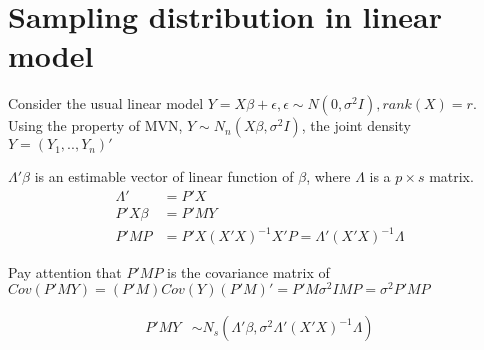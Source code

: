 
 \section{Sampling distribution in linear model}
 
 Consider the usual linear model $Y = X\beta + \epsilon, \epsilon \sim N(0, \sigma^2 I), rank(X) = r$. 
 Using the property of MVN, $Y \sim N_n (X \beta, \sigma^2 I) $, the joint density $Y = (Y_1, .., Y_n)'$
 
$\Lambda' \beta$ is an estimable vector of linear function of $\beta$, where $\Lambda$ is a $p \times s$ matrix. 
 \begin{align*}
\Lambda' &= P' X \\
P' X \beta &= P' MY \\
P' MP &= P' X (X'X)^{-1}X' P = \Lambda' (X'X)^{-1} \Lambda
\end{align*}

Pay attention that $P'MP$ is the covariance matrix of $Cov(P'MY) = (P'M) Cov(Y) (P'M)' = P'M \sigma^2 I MP = \sigma^2 P'MP$

 \begin{align*}
P' MY & \sim N_s (\Lambda' \beta, \sigma^2 \Lambda' (X'X)^{-1} \Lambda)
\end{align*}

